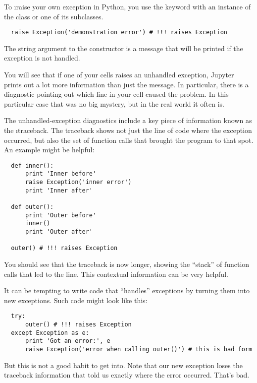 \documentclass[letterpaper, 12pt, titlepage, twoside]{article}
\begin{document}
To \i{raise} your own exception in Python, you use the  keyword with
an instance of the  class or one of its subclasses.

\begin{lstlisting}
  raise Exception('demonstration error') # !!! raises Exception
\end{lstlisting}

The string argument to the  constructor is a message that will be
printed if the exception is not handled.

You will see that if one of your cells raises an unhandled exception, Jupyter
prints out a lot more information than just the message. In particular, there
is a diagnostic pointing out which line in your cell caused the problem. In
this particular case that was no big mystery, but in the real world it often
is.

The unhandled-exception diagnostics include a key piece of information known
as the \i{traceback}. The traceback shows not just the line of code where the
exception occurred, but also the set of function calls that brought the
program to that spot. An example might be helpful:

\begin{lstlisting}
  def inner():
      print 'Inner before'
      raise Exception('inner error')
      print 'Inner after'

  def outer():
      print 'Outer before'
      inner()
      print 'Outer after'

  outer() # !!! raises Exception
\end{lstlisting}

You should see that the traceback is now longer, showing the ``stack'' of
function calls that led to the  line. This contextual information can
be very helpful.

It can be tempting to write code that ``handles'' exceptions by turning them
into new exceptions. Such code might look like this:

\begin{lstlisting}
  try:
      outer() # !!! raises Exception
  except Exception as e:
      print 'Got an error:', e
      raise Exception('error when calling outer()') # this is bad form
\end{lstlisting}

But this is not a good habit to get into. Note that our new exception loses
the traceback information that told us exactly where the error occurred.
That's bad.
\end{document}
